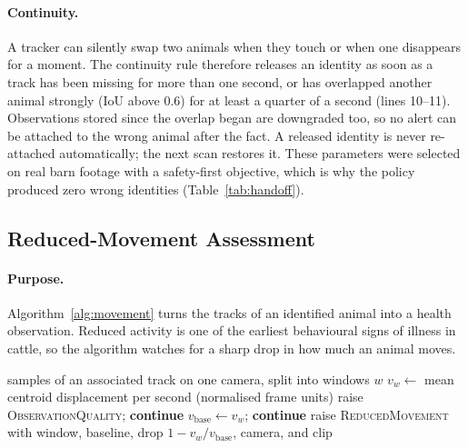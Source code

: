\documentclass[11pt,letterpaper]{article}
\begin{document}
\paragraph{Continuity.} A tracker can silently swap two animals when they touch or when one disappears for a moment. The continuity rule therefore releases an identity as soon as a track has been missing for more than one second, or has overlapped another animal strongly (IoU above 0.6) for at least a quarter of a second (lines 10--11). Observations stored since the overlap began are downgraded too, so no alert can be attached to the wrong animal after the fact. A released identity is never re-attached automatically; the next scan restores it. These parameters were selected on real barn footage with a safety-first objective, which is why the policy produced zero wrong identities (Table~\ref{tab:handoff}).

\subsection{Reduced-Movement Assessment}

\paragraph{Purpose.} Algorithm~\ref{alg:movement} turns the tracks of an identified animal into a health observation. Reduced activity is one of the earliest behavioural signs of illness in cattle, so the algorithm watches for a sharp drop in how much an animal moves.

\begin{algorithm}[H]
\caption{Reduced-movement assessment}
\label{alg:movement}
\begin{algorithmic}[1]
\Require samples of an associated track on one camera, split into windows $w$
  \State $v_w \gets$ mean centroid displacement per second (normalised frame units)
   \State raise \textsc{ObservationQuality}; \textbf{continue} \EndIf
   \State $v_{\text{base}} \gets v_w$; \textbf{continue} \EndIf
    \State raise \textsc{ReducedMovement} with window, baseline, drop $1 - v_w / v_{\text{base}}$, camera, and clip
  \EndIf
\EndFor
\end{algorithmic}
\end{algorithm}
\end{document}
